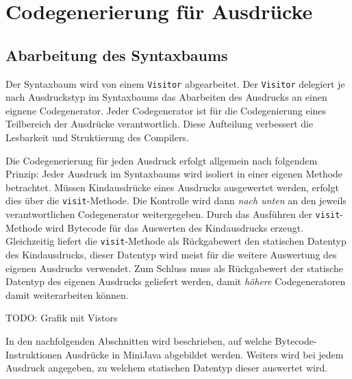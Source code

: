 

\section{Codegenerierung für Ausdrücke}
\label{sec:Codegenerierung-für-Ausdrücke}

\subsection{Abarbeitung des Syntaxbaums}
Der Syntaxbaum wird von einem \lstinline{Visitor} abgearbeitet. Der \lstinline{Visitor} delegiert je nach Ausdruckstyp im Syntaxbaums das Abarbeiten des Ausdrucks an einen eignene Codegenerator. Jeder Codegenerator ist für die Codegenierung eines Teilbereich der Ausdrücke verantwortlich. Diese Aufteilung verbessert die Lesbarkeit und Struktierung des Compilers.

Die Codegenerierung für jeden Ausdruck erfolgt allgemein nach folgendem Prinzip: Jeder Ausdruck im Syntaxbaums wird isoliert in einer eigenen Methode betrachtet. Müssen Kindausdrücke eines Ausdrucks ausgewertet werden, erfolgt dies über die \lstinline{visit}-Methode. Die Kontrolle wird dann \emph{nach unten} an den jeweils verantwortlichen Codegenerator weitergegeben. Durch das Ausführen der \lstinline{visit}-Methode wird Bytecode für das Auswerten des Kindausdrucks erzeugt. Gleichzeitig liefert die \lstinline{visit}-Methode als Rückgabewert den statischen Datentyp des Kindausdrucks, dieser Datentyp wird meist für die weitere Auswertung des eigenen Ausdrucks verwendet. Zum Schluss muss als Rückgabewert der statische Datentyp des eigenen Ausdrucks geliefert werden, damit \emph{höhere} Codegeneratoren damit weiterarbeiten können.

TODO: Grafik mit Vistors

In den nachfolgenden Abschnitten wird beschrieben, auf welche Bytecode-Instruktionen Ausdrücke in MiniJava abgebildet werden. Weiters wird bei jedem Ausdruck angegeben, zu welchem statischen Datentyp dieser auswertet wird.


